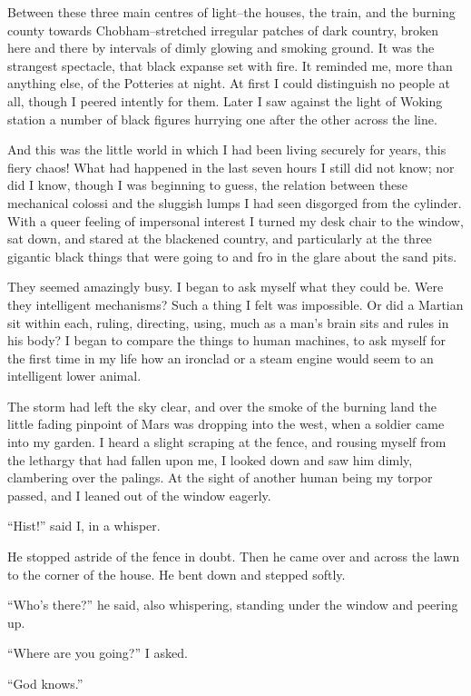 Between these three main centres of light--the houses, the train,
and the burning county towards Chobham--stretched irregular patches
of dark country, broken here and there by intervals of dimly
glowing and smoking ground. It was the strangest spectacle, that
black expanse set with fire. It reminded me, more than anything
else, of the Potteries at night. At first I could distinguish no
people at all, though I peered intently for them. Later I saw
against the light of Woking station a number of black figures
hurrying one after the other across the line.

And this was the little world in which I had been living securely
for years, this fiery chaos! What had happened in the last seven
hours I still did not know; nor did I know, though I was beginning
to guess, the relation between these mechanical colossi and the
sluggish lumps I had seen disgorged from the cylinder. With a queer
feeling of impersonal interest I turned my desk chair to the
window, sat down, and stared at the blackened country, and
particularly at the three gigantic black things that were going to
and fro in the glare about the sand pits.

They seemed amazingly busy. I began to ask myself what they could
be. Were they intelligent mechanisms? Such a thing I felt was
impossible. Or did a Martian sit within each, ruling, directing,
using, much as a man's brain sits and rules in his body? I began to
compare the things to human machines, to ask myself for the first
time in my life how an ironclad or a steam engine would seem to an
intelligent lower animal.

The storm had left the sky clear, and over the smoke of the burning
land the little fading pinpoint of Mars was dropping into the west,
when a soldier came into my garden. I heard a slight scraping at
the fence, and rousing myself from the lethargy that had fallen
upon me, I looked down and saw him dimly, clambering over the
palings. At the sight of another human being my torpor passed, and
I leaned out of the window eagerly.

``Hist!'' said I, in a whisper.

He stopped astride of the fence in doubt. Then he came over and
across the lawn to the corner of the house. He bent down and
stepped softly.

``Who's there?'' he said, also whispering, standing under the window
and peering up.

``Where are you going?'' I asked.

``God knows.''

